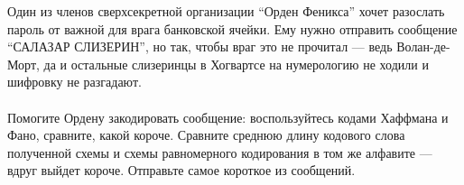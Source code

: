 \question
Один из членов сверхсекретной организации “Орден Феникса” хочет разослать пароль от важной для врага банковской ячейки. Ему нужно отправить сообщение “САЛАЗАР СЛИЗЕРИН”, но так, чтобы враг это не прочитал — ведь Волан-де-Морт, да и остальные слизеринцы в Хогвартсе на нумерологию не ходили и шифровку не разгадают.
\\
\\
Помогите Ордену закодировать сообщение: воспользуйтесь кодами Хаффмана и Фано, сравните, какой короче. Сравните среднюю длину кодового слова полученной схемы и схемы равномерного кодирования в том же алфавите — вдруг выйдет короче. Отправьте самое короткое из сообщений.